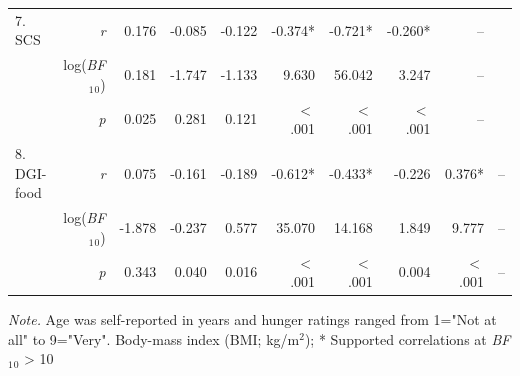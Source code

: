 \begin{appendix}
\begin{table}[h]
{\begin{tabular}{lrrrrrrrrr}
             7$.$ SCS  & \textit{r} & 0.176 & -0.085 & -0.122 & -0.374* & -0.721* & -0.260* & -- &    \\
             & log(\textit{BF}$_{1}$$_{0}$) & 0.181 & -1.747 & -1.133 & 9.630 & 56.042 & 3.247 & -- &   \\
             & \textit{p} & 0.025 & 0.281 & 0.121 & $<$ .001 & $<$ .001 & $<$ .001 & -- &    \\
             8$.$ DGI-food & \textit{r} & 0.075 & -0.161 & -0.189 & -0.612* & -0.433* & -0.226 & 0.376* & --  \\
             & log(\textit{BF}$_{1}$$_{0}$) & -1.878 & -0.237 & 0.577 & 35.070 & 14.168 & 1.849 & 9.777 & --  \\
             & \textit{p} & 0.343 & 0.040 & 0.016 & $<$ .001 & $<$ .001 & 0.004 & $<$ .001 & --  \\
            \bottomrule
        \end{tabular}
    }
\begin{tablenotes}[para]
\footnotesize{\textit{Note.} Age was self-reported in years and hunger ratings ranged from 1="Not at all" to 9="Very". Body-mass index (BMI; kg/m$^{2}$); * Supported correlations at \textit{BF}$_{1}$$_{0}$ > 10}
\end{tablenotes}
\end{table}
\end{appendix}
